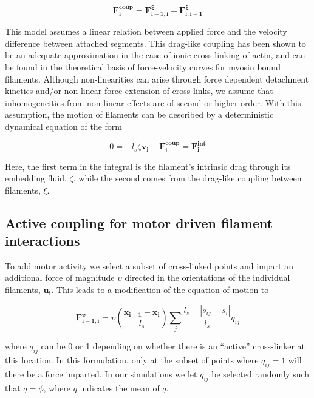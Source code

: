 \documentclass[10pt,letterpaper]{article}
\begin{document}
\begin{equation}
\label{eqn:drag}
\mathbf{F^{coup}_{i}} = \mathbf{F^{\xi}_{i-1,i}} + \mathbf{F^{\xi}_{i,i-1}} 
\end{equation}

This model assumes a linear relation between applied force and the velocity difference between attached segments.  This drag-like coupling has been shown to be an adequate approximation in the case of ionic cross-linking of actin\cite{mol_fric,theo_hydroish2}, and can be found in the theoretical basis of force-velocity curves for myosin bound filaments\cite{theo_frictionShila}. Although non-linearities can arise through force dependent detachment kinetics and/or non-linear force extension of cross-links, we assume that inhomogeneities from non-linear effects are of second or higher order. With this assumption, the motion of filaments can be described by a deterministic dynamical equation of the form

\begin{equation}
\label{eqn:syst1}
0 = -l_s\zeta\mathbf{ v_i} -\mathbf{F^{coup}_i}= \mathbf{F^{int}_i}
\end{equation}

Here, the first term in the integral is the filament's intrinsic drag through its embedding fluid, $\zeta$, while the second comes from the drag-like coupling between filaments, $\xi$.  

\subsection*{Active coupling for motor driven filament interactions}

To add motor activity we select a subset of cross-linked points and impart an additional force of magnitude $\upsilon$ directed in the orientations of the individual filaments, $\mathbf{u_i}$.  This leads to a modification of the equation of motion to

\begin{equation}
\label{eqn:moto}
\mathbf{F^{\upsilon}_{i-1,i}}=\upsilon \left(\frac{\mathbf{x_{i-1}}-\mathbf{x_{i}}}{l_s}\right)\sum_j \frac{l_s-|s_{ij}-s_i|}{l_s}q_{ij}
\end{equation}

where $q_{ij}$ can be 0 or 1 depending on whether there is an ``active'' cross-linker at this location.  In this formulation, only at the subset of points where $q_{ij}=1$ will there be a force imparted.  In our simulations we let $q_{ij}$ be selected randomly such that $\bar{q}=\phi$, where $\bar{q}$ indicates the mean of $q$.
\end{document}

